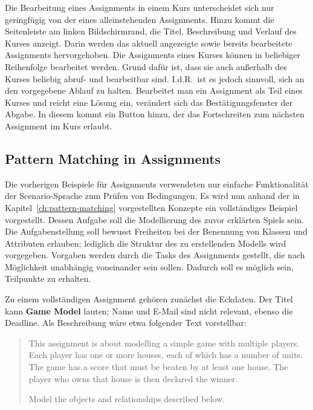 Die Bearbeitung eines Assignments in einem Kurs unterscheidet sich nur geringfügig von der eines alleinstehenden Assignments.
Hinzu kommt die Seitenleiste am linken Bildschirmrand, die Titel, Beschreibung und Verlauf des Kurses anzeigt.
Darin werden das aktuell angezeigte sowie bereits bearbeitete Assignments hervorgehoben.
Die Assignments eines Kurses können in beliebiger Reihenfolge bearbeitet werden.
Grund dafür ist, dass sie auch außerhalb des Kurses beliebig abruf- und bearbeitbar sind.
I.d.R.\ ist es jedoch sinnvoll, sich an den vorgegebene Ablauf zu halten.
Bearbeitet man ein Assignment als Teil eines Kurses und reicht eine Lösung ein, verändert sich das Bestätigungsfenster der Abgabe.
In diesem kommt ein Button hinzu, der das Fortschreiten zum nächsten Assignment im Kurs erlaubt.

\subsection{Pattern Matching in Assignments}\label{subsec:assignment-pattern-matching}

Die vorherigen Beispiele für Assignments verwendeten nur einfache Funktionalität der Scenario-Sprache zum Prüfen von Bedingungen.
Es wird nun anhand der in Kapitel~\ref{ch:pattern-matching} vorgestellten Konzepte ein vollständiges Beispiel vorgestellt.
Dessen Aufgabe soll die Modellierung des zuvor erklärten Spiels sein.
Die Aufgabenstellung soll bewusst Freiheiten bei der Benennung von Klassen und Attributen erlauben;
lediglich die Struktur des zu erstellenden Modells wird vorgegeben.
Vorgaben werden durch die Tasks des Assignments gestellt, die nach Möglichkeit unabhängig voneinander sein sollen.
Dadurch soll es möglich sein, Teilpunkte zu erhalten.

Zu einem vollständigen Assignment gehören zunächst die Eckdaten.
Der Titel kann \textbf{Game Model} lauten;
Name und E-Mail sind nicht relevant, ebenso die Deadline.
Als Beschreibung wäre etwa folgender Text vorstellbar:

\begin{quote}
    This assignment is about modelling a simple game with multiple players.
    Each player has one or more houses, each of which has a number of units.
    The game has a score that must be beaten by at least one house.
    The player who owns that house is then declared the winner.

    Model the objects and relationships described below.
\end{quote}

